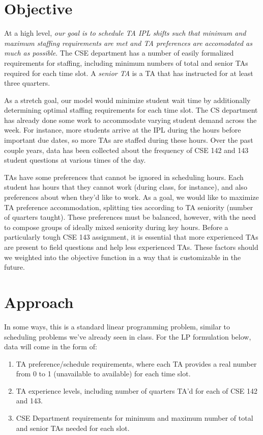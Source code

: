 \documentclass{article}
\begin{document}
\begin{multicols}{2}
\section*{Objective}

At a high level, \textit{our goal is to schedule TA IPL shifts such that minimum and maximum staffing requirements are met and TA preferences are accomodated as much as possible}. The CSE department has a number of easily formalized requirements for staffing, including minimum numbers of total and senior TAs required for each time slot. A \textit{senior TA} is a TA that has instructed for at least three quarters.

As a stretch goal, our model would minimize student wait time by additionally determining optimal staffing requirements for each time slot. The CS department has already done some work to accommodate varying student demand across the week. For instance, more students arrive at the IPL during the hours before important due dates, so more TAs are staffed during these hours. Over the past couple years, data has been collected about the frequency of CSE 142 and 143 student questions at various times of the day.

TAs have some preferences that cannot be ignored in scheduling hours. Each student has hours that they cannot work (during class, for instance), and also preferences about when they'd like to work. As a goal, we would like to maximize TA preference accommodation, splitting ties according to TA seniority (number of quarters taught). These preferences must be balanced, however, with the need to compose groups of ideally mixed seniority during key hours. Before a particularly tough CSE 143 assignment, it is essential that more experienced TAs are present to field questions and help less experienced TAs. These factors should we weighted into the objective function in a way that is customizable in the future.

\section*{Approach}
In some ways, this is a standard linear programming problem, similar to scheduling problems we've already seen in class. For the LP formulation below, data will come in the form of:
\begin{enumerate}
    \item TA preference/schedule requirements, where each TA provides a real number from 0 to 1 (unavailable to available) for each time slot.
    \item TA experience levels, including number of quarters TA'd for each of CSE 142 and 143.
    \item CSE Department requirements for minimum and maximum number of total and senior TAs needed for each slot.
\end{enumerate}


\end{multicols}
\end{document}
